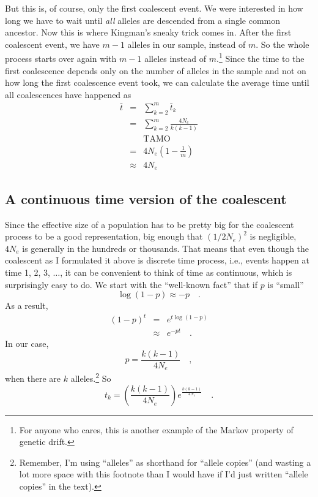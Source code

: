 But this is, of course, only the first coalescent event. We were
interested in how long we have to wait until {\it all\/} alleles are
descended from a single common ancestor. Now this is where Kingman's
sneaky trick comes in. After the first coalescent event, we have $m-1$
alleles in our sample, instead of $m$. So the whole process starts
over again with $m-1$ alleles instead of $m$.\footnote{For anyone who
  cares, this is another example of the Markov property of genetic
  drift.} Since the time to the
first coalescence depends only on the number of alleles in the sample
and not on how long the first coalescence event took, we can calculate
the average time until all coalescences have happened
as
\begin{eqnarray*}
\bar t &=& \sum_{k=2}^m \bar t_k \\
       &=& \sum_{k=2}^m \frac{4N_e}{k(k-1)} \\
       && \mbox{TAMO} \\
       &=& 4N_e\left(1 - \frac{1}{m}\right) \\
       &\approx& 4N_e
\end{eqnarray*}

\subsection*{A continuous time version of the coalescent}

Since the effective size of a population has to be pretty big for the
coalescent process to be a good representation, big enough that
$(1/2N_e)^2$ is negligible, $4N_e$ is generally in the hundreds or
thousands. That means that even though the coalescent as I formulated
it above is discrete time process, i.e., events happen at time 1, 2,
3, $\dots$, it can be convenient to think of time as continuous, which
is surprisingly easy to do. We start with the ``well-known fact'' that
if $p$ is ``small''
\[
\log(1-p) \approx -p \quad .
\]
As a result,
\begin{eqnarray*}
(1 - p)^t &=& e^{t \log(1-p)} \\
          &\approx& e^{-pt} \quad .
\end{eqnarray*}
In our case,
\[
p = \frac{k(k-1)}{4N_e} \quad ,
\]
when there are $k$ alleles.\footnote{Remember, I'm using ``alleles''
  as shorthand for ``allele copies'' (and wasting a lot more space
  with this footnote than I would have if I'd just written ``allele
  copies'' in the text).} So
\[
t_k = \left(\frac{k(k-1)}{4N_e}\right)e^{\frac{k(k-1)}{4N_e}} \quad .
\]


